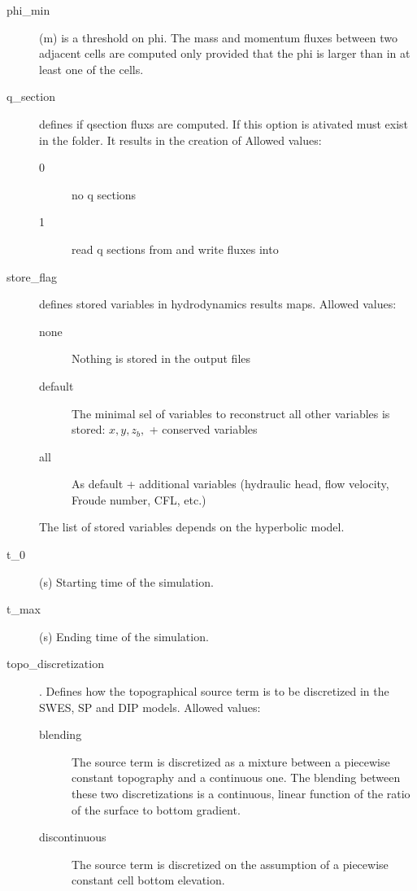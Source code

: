\begin{description}
\item[phi\_min] (m)  is a threshold on phi. The mass and momentum fluxes between two adjacent cells are computed only provided that the phi is larger than  in at least one of the cells.

\item[q\_section] defines if qsection fluxs are computed.
If this option is ativated  must exist in the  folder.
It results in the creation of  Allowed values:
\begin{description}
    \item[0] no q sections
    \item[1] read q sections from  and write fluxes into 
\end{description}

\item[store\_flag] defines stored variables in hydrodynamics results maps.  Allowed values: 
\begin{description}
\item [none] Nothing is stored in the output files
\item [default] The minimal sel of variables to reconstruct all other variables is stored: $x,y,z_b,$ + conserved variables
\item[all] As default + additional variables (hydraulic head, flow velocity, Froude number, CFL, etc.)
\end{description}

The list of stored variables depends on the hyperbolic model.

\item[t\_0] (s)  Starting time of the simulation. 

\item[t\_max] (s) Ending time of the simulation.

\item[topo\_discretization] . Defines how the topographical source term is to be discretized in the SWES, SP and DIP models. 
Allowed values:
\begin{description}
\item [blending] The source term is discretized as a mixture between a piecewise constant topography and a continuous one. The blending between these two discretizations is a continuous, linear function of the ratio of the surface to bottom gradient.
\item [discontinuous] The source term is discretized on the assumption of a piecewise constant cell bottom elevation.
\end{description}



\end{description}
